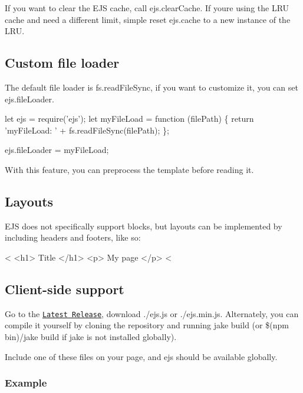 If you want to clear the E\+JS cache, call {\ttfamily ejs.\+clear\+Cache}. If you\textquotesingle{}re using the L\+RU cache and need a different limit, simple reset {\ttfamily ejs.\+cache} to a new instance of the L\+RU.

\subsection*{Custom file loader}

The default file loader is {\ttfamily fs.\+read\+File\+Sync}, if you want to customize it, you can set ejs.\+file\+Loader.


\begin{DoxyCode}
let ejs = require('ejs');
let myFileLoad = function (filePath) \{
  return 'myFileLoad: ' + fs.readFileSync(filePath);
\};

ejs.fileLoader = myFileLoad;
\end{DoxyCode}


With this feature, you can preprocess the template before reading it.

\subsection*{Layouts}

E\+JS does not specifically support blocks, but layouts can be implemented by including headers and footers, like so\+:


\begin{DoxyCode}
<%
<h1>
  Title
</h1>
<p>
  My page
</p>
<%
\end{DoxyCode}


\subsection*{Client-\/side support}

Go to the \href{https://github.com/mde/ejs/releases/latest}{\tt Latest Release}, download {\ttfamily ./ejs.js} or {\ttfamily ./ejs.min.\+js}. Alternately, you can compile it yourself by cloning the repository and running {\ttfamily jake build} (or {\ttfamily \$(npm bin)/jake build} if jake is not installed globally).

Include one of these files on your page, and {\ttfamily ejs} should be available globally.

\subsubsection*{Example}


